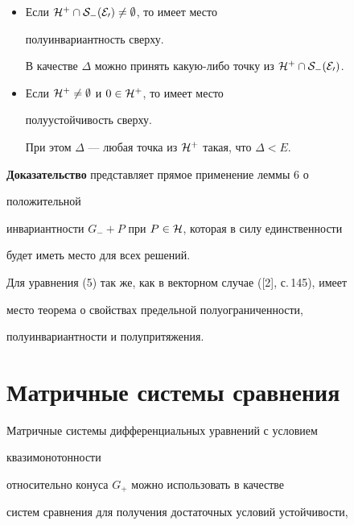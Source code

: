 {\begin{thm}
\begin{itemize}
точка 


из $\cal H\cap S_+(\Delta)$. 


\item[Б.] Если $\cal H^+\cap S_-(E_0)\ne\emptyset$, то имеет место 


полуинвариантность сверху. 


В качестве $\Delta$ можно принять какую-либо точку из $\cal H^+\cap 


S_-(E_0)$. 


\item[В.] Если $\cal H^+\ne\emptyset$ и $0\in\cal H^+$, то имеет место 


полуустойчивость сверху. 


При этом $\Delta$ --- любая точка из $\cal H^+$ такая, что $\Delta<E$. 


\end{itemize} 


\end{thm} 


 


{\bf Доказательство} представляет прямое применение леммы 6 о 


положительной 


инвариантности $G_-+P$ при $P\in\cal H$, которая в силу единственности 


будет иметь место для всех решений. 


 


Для уравнения (5) так же, как в векторном случае ([2], с.\,145), имеет 


место теорема о свойствах предельной полуограниченности, 


полуинвариантности и полупритяжения. 


 


\section{Матричные системы сравнения} 


 


Матричные системы дифференциальных уравнений с условием 


квазимонотонности 


относительно конуса $G_+$ можно использовать в качестве 


систем сравнения для получения достаточных условий устойчивости, 


}
